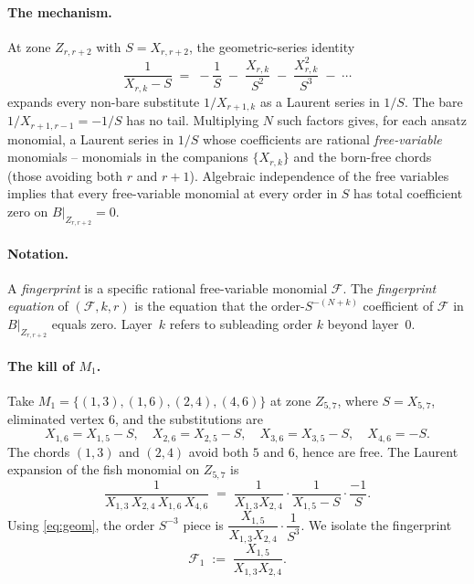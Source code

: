 \documentclass[11pt]{article}
\theoremstyle{definition}
\begin{document}
\paragraph{The mechanism.}
At zone $Z_{r,r+2}$ with $S=X_{r,r+2}$, the geometric-series identity
\begin{equation}\label{eq:geom}
   \frac{1}{X_{r,k}-S} \;=\; -\frac{1}{S} \;-\; \frac{X_{r,k}}{S^2}
   \;-\; \frac{X_{r,k}^{2}}{S^3} \;-\; \cdots
\end{equation}
expands every non-bare substitute $1/X_{r+1,k}$ as a Laurent series in
$1/S$. The bare $1/X_{r+1,r-1}=-1/S$ has no tail. Multiplying $N$ such
factors gives, for each ansatz monomial, a Laurent series in $1/S$ whose
coefficients are rational \emph{free-variable} monomials -- monomials
in the companions $\{X_{r,k}\}$ and the born-free chords (those avoiding
both $r$ and $r{+}1$). Algebraic independence of the free variables
implies that every free-variable monomial at every order in $S$ has
total coefficient zero on $B|_{Z_{r,r+2}}=0$.

\paragraph{Notation.}
A \emph{fingerprint} is a specific rational free-variable monomial
$\mathcal F$. The \emph{fingerprint equation} of $(\mathcal F, k, r)$ is
the equation that the order-$S^{-(N+k)}$ coefficient of $\mathcal F$ in
$B|_{Z_{r,r+2}}$ equals zero. Layer~$k$ refers to subleading order $k$
beyond layer~0.

\paragraph{The kill of $M_1$.}
Take $M_1=\{(1,3),(1,6),(2,4),(4,6)\}$ at zone $Z_{5,7}$, where
$S=X_{5,7}$, eliminated vertex $6$, and the substitutions are
\begin{equation}\label{eq:Z57subs}
   X_{1,6}=X_{1,5}-S,\quad X_{2,6}=X_{2,5}-S,\quad
   X_{3,6}=X_{3,5}-S,\quad X_{4,6}=-S.
\end{equation}
The chords $(1,3)$ and $(2,4)$ avoid both $5$ and $6$, hence are free.
The Laurent expansion of the fish monomial on $Z_{5,7}$ is
\[
   \frac{1}{X_{1,3}\,X_{2,4}\,X_{1,6}\,X_{4,6}}
   \;=\;
   \frac{1}{X_{1,3}X_{2,4}}\cdot\frac{1}{X_{1,5}-S}\cdot\frac{-1}{S}.
\]
Using \eqref{eq:geom}, the order $S^{-3}$ piece is
$\dfrac{X_{1,5}}{X_{1,3}X_{2,4}}\cdot\dfrac{1}{S^{3}}$. We isolate the
fingerprint
\[
   \mathcal F_1 \;:=\; \frac{X_{1,5}}{X_{1,3}X_{2,4}}.
\]
\end{document}
